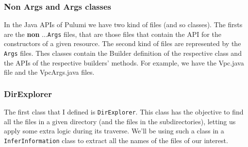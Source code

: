 \subsubsection{Non Args and Args classes}
In the Java APIs of Pulumi we have two kind of files (and so classes).
The firsts are the \textbf{non} ...\texttt{Args} files, that are those files that contain the API for the constructors of a given resource.
The second kind of files are represented by the \texttt{Args} files.
Thes classes contain the Builder definition of the respective class and the APIs of the respective builders' methods.%
For example, we have the Vpc.java file and the VpcArgs.java files.

\subsubsection{DirExplorer}
The first class that I defined is \texttt{DirExplorer}. This class has the objective to find all the files in a given directory (and the files in the subdirectories), letting us apply some extra logic during its traverse.
We'll be using such a class in a \texttt{InferInformation} class to extract all the names of the files of our interest.\\

